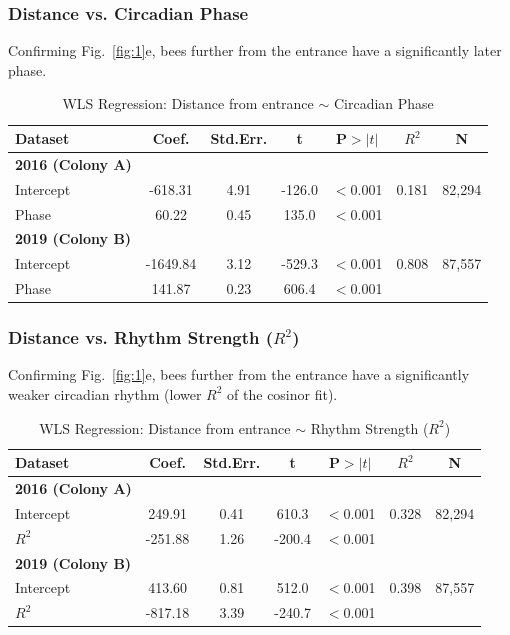 \documentclass{article}
\begin{document}
{\subsubsection*{Distance vs. Circadian Phase}
Confirming Fig.~\ref{fig:1}e, bees further from the entrance have a significantly later phase.

\begin{table}[h]
\centering
\caption{WLS Regression: Distance from entrance $\sim$ Circadian Phase}
\label{tab:dist_phase}
\begin{tabular}{lcccccc}
\toprule
Dataset & Coef. & Std.Err. & t & P$>|t|$ & $R^2$ & N \\
\midrule
\textbf{2016 (Colony A)} & & & & & & \\
Intercept & -618.31 & 4.91 & -126.0 & $<$0.001 & 0.181 & 82,294 \\
Phase & 60.22 & 0.45 & 135.0 & $<$0.001 & & \\
\midrule
\textbf{2019 (Colony B)} & & & & & & \\
Intercept & -1649.84 & 3.12 & -529.3 & $<$0.001 & 0.808 & 87,557 \\
Phase & 141.87 & 0.23 & 606.4 & $<$0.001 & & \\
\bottomrule
\end{tabular}
\end{table}

\subsubsection*{Distance vs. Rhythm Strength ($R^2$)}
Confirming Fig.~\ref{fig:1}e, bees further from the entrance have a significantly weaker circadian rhythm (lower $R^2$ of the cosinor fit).

\begin{table}[h]
\centering
\caption{WLS Regression: Distance from entrance $\sim$ Rhythm Strength ($R^2$)}
\label{tab:dist_r2}
\begin{tabular}{lcccccc}
\toprule
Dataset & Coef. & Std.Err. & t & P$>|t|$ & $R^2$ & N \\
\midrule
\textbf{2016 (Colony A)} & & & & & & \\
Intercept & 249.91 & 0.41 & 610.3 & $<$0.001 & 0.328 & 82,294 \\
$R^2$ & -251.88 & 1.26 & -200.4 & $<$0.001 & & \\
\midrule
\textbf{2019 (Colony B)} & & & & & & \\
Intercept & 413.60 & 0.81 & 512.0 & $<$0.001 & 0.398 & 87,557 \\
$R^2$ & -817.18 & 3.39 & -240.7 & $<$0.001 & & \\
\bottomrule
\end{tabular}
\end{table}

}
\end{document}
